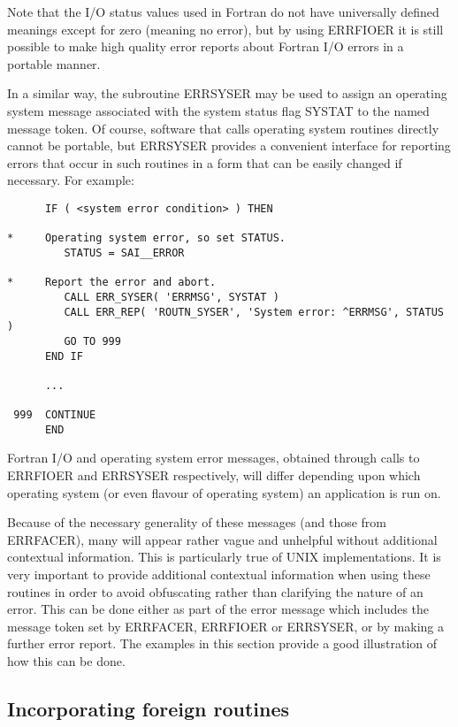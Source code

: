\documentclass[twoside,11pt]{article}
\newcommand{\xlabel}[1]{}
\renewcommand{\_}{\texttt{\symbol{95}}}
\begin{document}
Note that the I/O status values used in Fortran do not have universally
defined meanings except for zero (meaning no error), but by using
ERR\_FIOER it is still possible to make high quality error reports about
Fortran I/O errors in a portable manner. 

In a similar way, the subroutine ERR\_SYSER may be used to assign an 
operating system message associated with the 
system status flag SYSTAT to the named message token.
Of course, software that calls operating system routines directly cannot be
portable, but ERR\_SYSER provides a convenient interface for reporting 
errors that occur in such routines in a form that can be easily changed if 
necessary.
For example:

\begin {small}
\begin{verbatim}
      IF ( <system error condition> ) THEN

*     Operating system error, so set STATUS.
         STATUS = SAI__ERROR

*     Report the error and abort.
         CALL ERR_SYSER( 'ERRMSG', SYSTAT )
         CALL ERR_REP( 'ROUTN_SYSER', 'System error: ^ERRMSG', STATUS )
         GO TO 999
      END IF

      ...

 999  CONTINUE
      END
\end{verbatim}
\end {small}

Fortran I/O and operating system error messages, obtained through calls to 
ERR\_FIOER and ERR\_SYSER respectively, will differ depending upon which 
operating system (or even flavour of operating system) an application is run on.

Because of the necessary generality of these messages (and those from
ERR\_FACER), many will appear rather vague and unhelpful without additional 
contextual information.
This is particularly true of UNIX implementations.
It is very important to provide additional contextual information when using
these routines in order to avoid obfuscating rather than clarifying the nature 
of an error.
This can be done either as part of the error message which includes the message
token set by ERR\_FACER, ERR\_FIOER or ERR\_SYSER, or by making a further 
error report.
The examples in this section provide a good illustration of how this can 
be done.


\subsection{\xlabel{incorporating_foreign_routines}Incorporating foreign routines \label{foreign_sect}}
\end{document}
